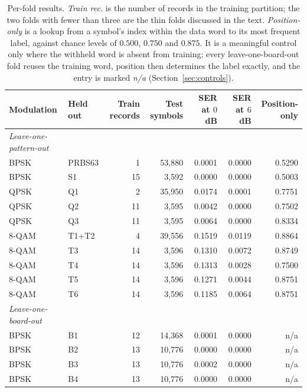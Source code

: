 \documentclass[journal]{IEEEtran}   %
\begin{document}
\begin{table}[!t]
\caption{Per-fold results. \emph{Train rec.} is the number of records in the
training partition; the two folds with fewer than three are the thin folds
discussed in the text. \emph{Position-only} is a lookup from a symbol's index
within the data word to its most frequent label, against chance levels of
$0.500$, $0.750$ and $0.875$. It is a meaningful control only where the withheld
word is absent from training; every leave-one-board-out fold reuses the training
word, position then determines the label exactly, and the entry is marked
\textit{n/a} (Section~\ref{sec:controls}).
}

\label{tab:perfold}
\centering
\begin{tabular}{llrrrrr}
\toprule
Modulation & Held out & Train records & Test symbols
& SER at $0$~dB & SER at $6$~dB & Position-only \\
\midrule
\textit{Leave-one-pattern-out} & & & & & & \\
BPSK & PRBS63 & 1 & 53{,}880 & 0.0001 & 0.0000 & 0.5290 \\
BPSK & S1 & 15 & 3{,}592 & 0.0000 & 0.0000 & 0.5003 \\
QPSK & Q1 & 2 & 35{,}950 & 0.0174 & 0.0001 & 0.7751 \\
QPSK & Q2 & 11 & 3{,}595 & 0.0042 & 0.0000 & 0.7502 \\
QPSK & Q3 & 11 & 3{,}595 & 0.0064 & 0.0000 & 0.8334 \\
8-QAM & T1+T2 & 4 & 39{,}556 & 0.1519 & 0.0119 & 0.8864 \\
8-QAM & T3 & 14 & 3{,}596 & 0.1310 & 0.0072 & 0.8749 \\
8-QAM & T4 & 14 & 3{,}596 & 0.1313 & 0.0028 & 0.7500 \\
8-QAM & T5 & 14 & 3{,}596 & 0.1271 & 0.0044 & 0.8751 \\
8-QAM & T6 & 14 & 3{,}596 & 0.1185 & 0.0064 & 0.8751 \\
\addlinespace
\textit{Leave-one-board-out} & & & & & & \\
BPSK & B1 & 12 & 14{,}368 & 0.0001 & 0.0000 & n/a \\
BPSK & B2 & 13 & 10{,}776 & 0.0000 & 0.0000 & n/a \\
BPSK & B3 & 13 & 10{,}776 & 0.0002 & 0.0000 & n/a \\
BPSK & B4 & 13 & 10{,}776 & 0.0000 & 0.0000 & n/a \\

\end{tabular}
\end{table}
\end{document}
